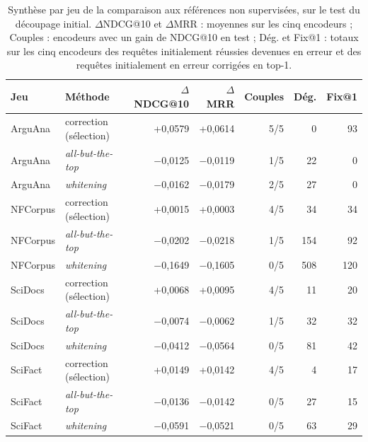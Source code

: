 \documentclass[a4paper,10pt]{article}
\begin{document}
\begin{table}[p]
\centering
\small
\begin{tabular}{llrrrrr}
\toprule
Jeu & Méthode & $\Delta$NDCG@10 & $\Delta$MRR & Couples & Dég. & Fix@1 \\
\midrule
ArguAna & correction (sélection) & +0,0579 & +0,0614 & 5/5 & 0 & 93 \\
ArguAna & \textit{all-but-the-top} & $-$0,0125 & $-$0,0119 & 1/5 & 22 & 0 \\
ArguAna & \textit{whitening} & $-$0,0162 & $-$0,0179 & 2/5 & 27 & 0 \\
\midrule
NFCorpus & correction (sélection) & +0,0015 & +0,0003 & 4/5 & 34 & 34 \\
NFCorpus & \textit{all-but-the-top} & $-$0,0202 & $-$0,0218 & 1/5 & 154 & 92 \\
NFCorpus & \textit{whitening} & $-$0,1649 & $-$0,1605 & 0/5 & 508 & 120 \\
\midrule
SciDocs & correction (sélection) & +0,0068 & +0,0095 & 4/5 & 11 & 20 \\
SciDocs & \textit{all-but-the-top} & $-$0,0074 & $-$0,0062 & 1/5 & 32 & 32 \\
SciDocs & \textit{whitening} & $-$0,0412 & $-$0,0564 & 0/5 & 81 & 42 \\
\midrule
SciFact & correction (sélection) & +0,0149 & +0,0142 & 4/5 & 4 & 17 \\
SciFact & \textit{all-but-the-top} & $-$0,0136 & $-$0,0142 & 0/5 & 27 & 15 \\
SciFact & \textit{whitening} & $-$0,0591 & $-$0,0521 & 0/5 & 63 & 29 \\
\bottomrule
\end{tabular}
\caption{Synthèse par jeu de la comparaison aux références non supervisées, sur le test du découpage initial. $\Delta$NDCG@10 et $\Delta$MRR : moyennes sur les cinq encodeurs ; Couples : encodeurs avec un gain de NDCG@10 en test ; Dég. et Fix@1 : totaux sur les cinq encodeurs des requêtes initialement réussies devenues en erreur et des requêtes initialement en erreur corrigées en top-1.}
\label{tab:s-references-synthese}
\end{table}
\end{document}
